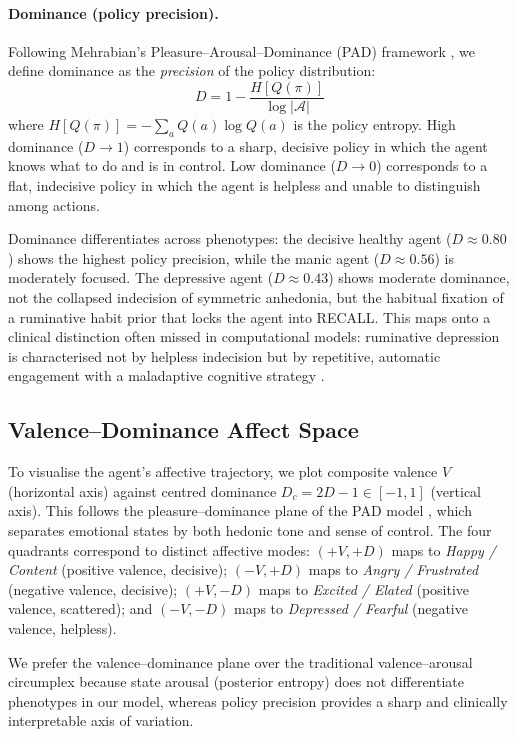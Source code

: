 \documentclass[11pt,a4paper]{article}
\begin{document}
\paragraph{Dominance (policy precision).} Following Mehrabian's Pleasure--Arousal--Dominance (PAD) framework \citep{mehrabian1996pleasure}, we define dominance as the \emph{precision} of the policy distribution:
\begin{equation}
    D = 1 - \frac{H[Q(\pi)]}{\log |\mathcal{A}|}
\end{equation}
where $H[Q(\pi)] = -\sum_a Q(a) \log Q(a)$ is the policy entropy. High dominance ($D \to 1$) corresponds to a sharp, decisive policy in which the agent knows what to do and is in control. Low dominance ($D \to 0$) corresponds to a flat, indecisive policy in which the agent is helpless and unable to distinguish among actions.

Dominance differentiates across phenotypes: the decisive healthy agent ($D \approx 0.80$) shows the highest policy precision, while the manic agent ($D \approx 0.56$) is moderately focused. The depressive agent ($D \approx 0.43$) shows moderate dominance, not the collapsed indecision of symmetric anhedonia, but the habitual fixation of a ruminative habit prior that locks the agent into RECALL. This maps onto a clinical distinction often missed in computational models: ruminative depression is characterised not by helpless indecision but by repetitive, automatic engagement with a maladaptive cognitive strategy \citep{nolenhoeksema1991responses}.

\subsection{Valence--Dominance Affect Space}

To visualise the agent's affective trajectory, we plot composite valence $V$ (horizontal axis) against centred dominance $D_c = 2D - 1 \in [-1, 1]$ (vertical axis). This follows the pleasure--dominance plane of the PAD model \citep{mehrabian1996pleasure}, which separates emotional states by both hedonic tone and sense of control. The four quadrants correspond to distinct affective modes: $(+V, +D)$ maps to \emph{Happy / Content} (positive valence, decisive); $(-V, +D)$ maps to \emph{Angry / Frustrated} (negative valence, decisive); $(+V, -D)$ maps to \emph{Excited / Elated} (positive valence, scattered); and $(-V, -D)$ maps to \emph{Depressed / Fearful} (negative valence, helpless).

We prefer the valence--dominance plane over the traditional valence--arousal circumplex \citep{russell1980circumplex} because state arousal (posterior entropy) does not differentiate phenotypes in our model, whereas policy precision provides a sharp and clinically interpretable axis of variation.
\end{document}
